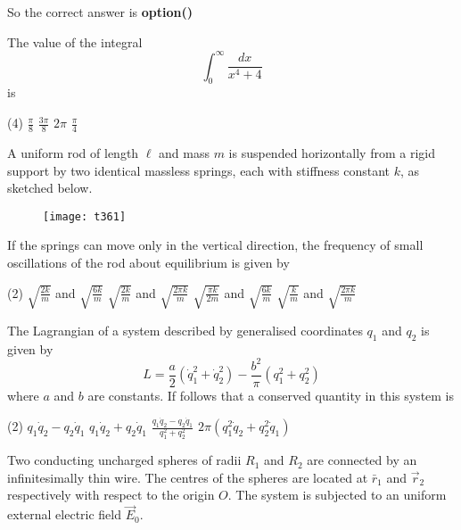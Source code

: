 \begin{questions}
\begin{answer}
	So the correct answer is \textbf{option()}
\end{answer}
\begin{minipage}{\textwidth}
	\question The value of the integral
	$$
	\int_{0}^{\infty} \frac{d x}{x^{4}+4}
	$$
	is
\end{minipage}
\begin{tasks}(4)
	\task[\textbf{A.}] $\frac{\pi}{8}$
	\task[\textbf{B.}] $\frac{3 \pi}{8}$
	\task[\textbf{C.}] $2 \pi$
	\task[\textbf{D.}] $\frac{\pi}{4}$
\end{tasks}
\begin{minipage}{\textwidth}
	\question A uniform rod of length $\ell$ and mass $m$ is suspended horizontally from a rigid support by two identical massless springs, each with stiffness constant $k$, as sketched below.\\
	\begin{figure}[H]
		\centering
		\texttt{[image: t361]}
	\end{figure}
	If the springs can move only in the vertical direction, the frequency of small oscillations of the rod about equilibrium is given by
\end{minipage}
\begin{tasks}(2)
	\task[\textbf{A.}]   $\sqrt{\frac{2 k}{m}}$ and $\sqrt{\frac{6 k}{m}}$
	\task[\textbf{B.}] $\sqrt{\frac{2 k}{m}}$ and $\sqrt{\frac{2 \pi k}{m}}$
	\task[\textbf{C.}] $\sqrt{\frac{\pi k}{2 m}}$ and $\sqrt{\frac{6 k}{m}}$
	\task[\textbf{D.}] $\sqrt{\frac{k}{m}}$ and $\sqrt{\frac{2 \pi k}{m}}$
\end{tasks}
\begin{minipage}{\textwidth}
	\question The Lagrangian of a system described by generalised coordinates $q_{1}$ and $q_{2}$ is given by
	$$
	L=\frac{a}{2}\left(\dot{q}_{1}^{2}+\dot{q}_{2}^{2}\right)-\frac{b^{2}}{\pi}\left(q_{1}^{2}+q_{2}^{2}\right)
	$$
	where $a$ and $b$ are constants. If follows that a conserved quantity in this system is
\end{minipage}
\begin{tasks}(2)
	\task[\textbf{A.}] $q_{1} \dot{q}_{2}-q_{2} \dot{q}_{1}$
	\task[\textbf{B.}] $q_{1} \dot{q}_{2}+q_{2} \dot{q}_{1}$
	\task[\textbf{C.}] $\frac{q_{1} \dot{q}_{2}-q_{2} \dot{q}_{1}}{q_{1}^{2}+q_{2}^{2}}$
	\task[\textbf{D.}] $2 \pi\left(q_{1}^{2} \dot{q}_{2}+q_{2}^{2} \dot{q}_{1}\right)$
\end{tasks}
\begin{minipage}{\textwidth}
	\question Two conducting uncharged spheres of radii $R_{1}$ and $R_{2}$ are connected by an infinitesimally thin wire. The centres of the spheres are located at $\bar{r}_{1}$ and $\vec{r}_{2}$ respectively with respect to the origin $O$. The system is subjected to an uniform external electric field $\vec{E}_{0}$.\\

\end{minipage}
\end{questions}
